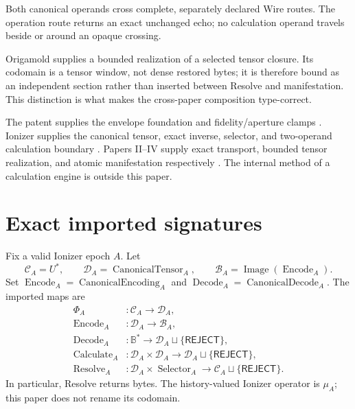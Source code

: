 \documentclass[11pt,letterpaper]{article}
\newcommand{\Reject}{\mathsf{REJECT}}
\newcommand{\Enc}{\operatorname{Encode}}
\newcommand{\Dec}{\operatorname{Decode}}
\newcommand{\Calc}{\operatorname{Calculate}}
\newcommand{\Resolve}{\operatorname{Resolve}}
\theoremstyle{definition}
\begin{document}
Both canonical operands cross complete, separately declared Wire routes.  The
operation route returns an exact unchanged echo; no calculation operand travels
beside or around an opaque crossing.

Origamold supplies a bounded realization of a selected tensor closure.  Its
codomain is a tensor window, not dense restored bytes; it is therefore bound
as an independent section rather than inserted between Resolve and
manifestation.  This distinction is what makes the cross-paper composition
type-correct.

The patent supplies the envelope foundation and fidelity/aperture clamps
\cite{ram2026patent}.  Ionizer supplies the canonical tensor, exact inverse,
selector, and two-operand calculation boundary \cite{ram2026srft}.  Papers
II--IV supply exact transport, bounded tensor realization, and atomic
manifestation respectively \cite{ram2026transport,ram2026window,ram2026manifest}.
The internal method of a calculation engine is outside this paper.

\section{Exact imported signatures}

Fix a valid Ionizer epoch $A$.  Let
\[
\mathcal C_A=U^*,\qquad
\mathcal D_A=\operatorname{CanonicalTensor}_A,
\qquad \mathcal B_A=\operatorname{Image}(\Enc_A).
\]
Set $\Enc_A=\operatorname{CanonicalEncoding}_A$ and
$\Dec_A=\operatorname{CanonicalDecode}_A$.  The imported maps are
\begin{align}
\Phi_A &: \mathcal C_A\to\mathcal D_A,\\
\Enc_A &: \mathcal D_A\to\mathcal B_A,\\
\Dec_A &: \mathbb B^*\to\mathcal D_A\sqcup\{\Reject\},\\
\Calc_A &: \mathcal D_A\times\mathcal D_A
       \to\mathcal D_A\sqcup\{\Reject\},\\
\Resolve_A &: \mathcal D_A\times\operatorname{Selector}_A
       \to\mathcal C_A\sqcup\{\Reject\}.
\end{align}
In particular, Resolve returns bytes.  The history-valued Ionizer operator is
$\mu_A$; this paper does not rename its codomain.
\end{document}
